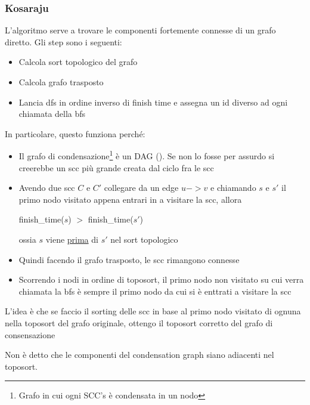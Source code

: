 \subsubsection{Kosaraju}
L'algoritmo serve a trovare le componenti fortemente connesse di un grafo diretto. Gli step sono i seguenti:
\begin{itemize}
	\item Calcola sort topologico del grafo
	\item Calcola grafo trasposto
	\item Lancia dfs in ordine inverso di finish time e assegna un id diverso ad ogni chiamata della bfs
\end{itemize}
In particolare, questo funziona perché:
\begin{itemize}
	\item Il grafo di condensazione\footnote{Grafo in cui ogni SCC's è condensata in un nodo} è un DAG (). Se non lo fosse per assurdo si creerebbe un scc più grande creata dal ciclo fra le scc
	\item Avendo due scc $ C $ e $ C' $ collegare da un edge $ u -> v $  e chiamando $ s $ e $ s' $ il primo nodo visitato appena entrari in a visitare la scc, allora
	      \begin{center}
		      finish\_time($s$) $ > $ finish\_time($s'$)
	      \end{center}
	      ossia $ s $ viene \underline{prima} di $ s' $ nel sort topologico
	\item Quindi facendo il grafo trasposto, le scc rimangono connesse
	\item Scorrendo i nodi in ordine di toposort, il primo nodo non visitato su cui verra chiamata la bfs è sempre il primo nodo da cui si è enttrati a visitare la scc
\end{itemize}
L'idea è che se faccio il sorting delle scc in base al primo nodo visitato di ognuna nella toposort del grafo originale, ottengo il toposort corretto del grafo di consensazione

\vskip3mm
Non è detto che le componenti del condensation graph siano adiacenti nel toposort.
\vskip3mm
\begin{center}
\end{center}

